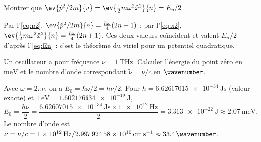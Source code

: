 \begin{question}[3 pts]\label{q:virial}
  Montrer que $\ev{\op{p}^{2}/2m}{n}=\ev{\tfrac12 m\omega^{2}\op{x}^{2}}{n}=E_{n}/2$.
\end{question}

\begin{solution}
  Par l'\cref{eq:p2}, $\ev{\op{p}^{2}/2m}{n}=\tfrac{\hbar\omega}{4}(2n+1)$ ; par
  l'\cref{eq:x2}, $\ev{\tfrac12 m\omega^{2}\op{x}^{2}}{n}=\tfrac{\hbar\omega}{4}(2n+1)$.
  Ces deux valeurs coïncident et valent $E_{n}/2$ d'après l'\cref{eq:En} :
  c'est le théorème du viriel pour un potentiel quadratique.
\end{solution}

\begin{question}[2 pts]\label{q:numerique}
  Un oscillateur a pour fréquence $\nu=\qty{1}{\tera\hertz}$. Calculer
  l'énergie du point zéro en $\unit{\milli\electronvolt}$ et le nombre d'onde
  correspondant $\tilde\nu=\nu/c$ en $\unit{\wavenumber}$.
\end{question}

\begin{solution}
  Avec $\omega=2\pi\nu$, on a $E_{0}=\hbar\omega/2=h\nu/2$. Pour
  $h=\qty{6.62607015e-34}{\joule\second}$ (valeur exacte) et
  $\qty{1}{\electronvolt}=\qty{1.602176634e-19}{\joule}$,
  \begin{equation}
    E_{0}=\frac{h\nu}{2}
    =\frac{\qty{6.62607015e-34}{\joule\second}\times\qty{1e12}{\hertz}}{2}
    =\qty{3.313e-22}{\joule}\approx\qty{2.07}{\milli\electronvolt}.
  \end{equation}
  Le nombre d'onde est
  $\tilde\nu=\nu/c=\qty{1e12}{\hertz}/\qty{2.99792458e10}{\centi\metre\per\second}
  \approx\qty{33.4}{\wavenumber}$.
\end{solution}
